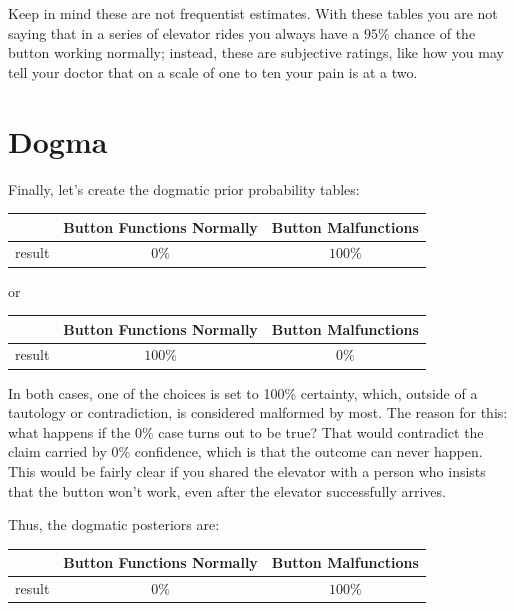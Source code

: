 \documentclass[
  letterpaper,
  DIV=11,
  numbers=noendperiod]{scrreprt}
\newcounter{none} %
\theoremstyle{remark}
\begin{document}
Keep in mind these are not frequentist estimates. With these tables you
are not saying that in a series of elevator rides you always have a
\(95\%\) chance of the button working normally; instead, these are
subjective ratings, like how you may tell your doctor that on a scale of
one to ten your pain is at a two.

\section{Dogma}\label{dogma}

Finally, let's create the dogmatic prior probability tables:

{\def\LTcaptype{none} %
\begin{longtable}[]{@{}lcc@{}}
\toprule\noalign{}
& Button Functions Normally & Button Malfunctions \\
\midrule\noalign{}
\endhead
\bottomrule\noalign{}
\endlastfoot
result & \(0\%\) & \(100\%\) \\
\end{longtable}
}

or

{\def\LTcaptype{none} %
\begin{longtable}[]{@{}lcc@{}}
\toprule\noalign{}
& Button Functions Normally & Button Malfunctions \\
\midrule\noalign{}
\endhead
\bottomrule\noalign{}
\endlastfoot
result & \(100\%\) & \(0\%\) \\
\end{longtable}
}

In both cases, one of the choices is set to 100\% certainty, which,
outside of a tautology or contradiction, is considered malformed by
most. The reason for this: what happens if the \(0\%\) case turns out to
be true? That would contradict the claim carried by \(0\%\) confidence,
which is that the outcome can never happen. This would be fairly clear
if you shared the elevator with a person who insists that the button
won't work, even after the elevator successfully arrives.

Thus, the dogmatic posteriors are:

{\def\LTcaptype{none} %
\begin{longtable}[]{@{}lcc@{}}
\toprule\noalign{}
& Button Functions Normally & Button Malfunctions \\
\midrule\noalign{}
\endhead
\bottomrule\noalign{}
\endlastfoot
result & \(0\%\) & \(100\%\) \\
\end{longtable}
}
\end{document}

